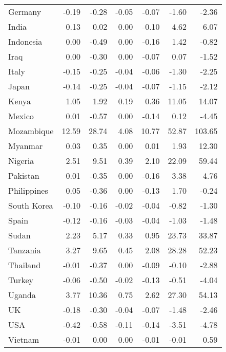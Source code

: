 \begin{table}[b]
\begin{tabular}[t]{lrrrrrr}
Germany & -0.19 & -0.28 & -0.05 & -0.07 & -1.60 & -2.36\\
India & 0.13 & 0.02 & 0.00 & -0.10 & 4.62 & 6.07\\
Indonesia & 0.00 & -0.49 & 0.00 & -0.16 & 1.42 & -0.82\\
Iraq & 0.00 & -0.30 & 0.00 & -0.07 & 0.07 & -1.52\\
Italy & -0.15 & -0.25 & -0.04 & -0.06 & -1.30 & -2.25\\
Japan & -0.14 & -0.25 & -0.04 & -0.07 & -1.15 & -2.12\\
Kenya & 1.05 & 1.92 & 0.19 & 0.36 & 11.05 & 14.07\\
Mexico & 0.01 & -0.57 & 0.00 & -0.14 & 0.12 & -4.45\\
Mozambique & 12.59 & 28.74 & 4.08 & 10.77 & 52.87 & 103.65\\
Myanmar & 0.03 & 0.35 & 0.00 & 0.01 & 1.93 & 12.30\\
Nigeria & 2.51 & 9.51 & 0.39 & 2.10 & 22.09 & 59.44\\
Pakistan & 0.01 & -0.35 & 0.00 & -0.16 & 3.38 & 4.76\\
Philippines & 0.05 & -0.36 & 0.00 & -0.13 & 1.70 & -0.24\\
South Korea & -0.10 & -0.16 & -0.02 & -0.04 & -0.82 & -1.30\\
Spain & -0.12 & -0.16 & -0.03 & -0.04 & -1.03 & -1.48\\
Sudan & 2.23 & 5.17 & 0.33 & 0.95 & 23.73 & 33.87\\
Tanzania & 3.27 & 9.65 & 0.45 & 2.08 & 28.28 & 52.23\\
Thailand & -0.01 & -0.37 & 0.00 & -0.09 & -0.10 & -2.88\\
Turkey & -0.06 & -0.50 & -0.02 & -0.13 & -0.51 & -4.04\\
Uganda & 3.77 & 10.36 & 0.75 & 2.62 & 27.30 & 54.13\\
UK & -0.18 & -0.30 & -0.04 & -0.07 & -1.48 & -2.46\\
USA & -0.42 & -0.58 & -0.11 & -0.14 & -3.51 & -4.78\\
Vietnam & -0.01 & 0.00 & 0.00 & -0.01 & -0.01 & 0.59\\
\bottomrule
\end{tabular}
\end{table}